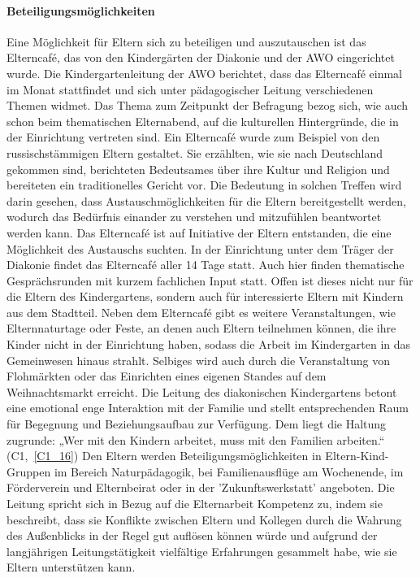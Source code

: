 \paragraph{Beteiligungsmöglichkeiten}
Eine Möglichkeit für Eltern sich zu beteiligen und auszutauschen ist das Elterncafé, das von den Kindergärten der Diakonie und der AWO eingerichtet wurde. 
Die Kindergartenleitung der AWO berichtet, dass das Elterncafé einmal im Monat stattfindet und sich unter pädagogischer Leitung verschiedenen Themen widmet. Das Thema zum Zeitpunkt der Befragung bezog sich, wie auch schon beim thematischen Elternabend, auf die kulturellen Hintergründe, die in der Einrichtung vertreten sind. Ein Elterncafé wurde zum Beispiel von den russischstämmigen Eltern gestaltet. Sie erzählten, wie sie nach Deutschland gekommen sind, berichteten Bedeutsames über ihre Kultur und Religion und bereiteten ein traditionelles Gericht vor. 
Die Bedeutung in solchen Treffen wird darin gesehen, dass Austauschmöglichkeiten für die Eltern bereitgestellt werden, wodurch das Bedürfnis einander zu verstehen und mitzufühlen beantwortet werden kann. Das Elterncafé ist auf Initiative der Eltern entstanden, die eine Möglichkeit des Austauschs suchten. 
In der Einrichtung unter dem Träger der Diakonie findet das Elterncafé aller 14 Tage statt. Auch hier finden thematische Gesprächsrunden mit kurzem fachlichen Input statt. Offen ist dieses nicht nur für die Eltern des Kindergartens, sondern auch für interessierte Eltern mit Kindern aus dem Stadtteil. 
Neben dem Elterncafé gibt es weitere Veranstaltungen, wie Elternnaturtage oder Feste, an denen auch Eltern teilnehmen können, die ihre Kinder nicht in der Einrichtung haben, sodass die Arbeit im Kindergarten in das Gemeinwesen hinaus strahlt. Selbiges wird auch durch die Veranstaltung von Flohmärkten oder das Einrichten eines eigenen Standes auf dem Weihnachtsmarkt erreicht.
Die Leitung des diakonischen Kindergartens betont eine emotional enge Interaktion mit der Familie und stellt entsprechenden Raum für Begegnung und Beziehungsaufbau zur Verfügung. Dem liegt die Haltung zugrunde: „Wer mit den Kindern arbeitet, muss mit den Familien arbeiten.“ (C1,~\ref{C1_16}) Den Eltern werden Beteiligungsmöglichkeiten in Eltern-Kind-Gruppen im Bereich Naturpädagogik, bei Familienausflüge am Wochenende, im Förderverein und Elternbeirat oder in der 'Zukunftswerkstatt' angeboten. Die Leitung spricht sich in Bezug auf die Elternarbeit Kompetenz zu, indem sie beschreibt, dass sie Konflikte zwischen Eltern und Kollegen durch die Wahrung des Außenblicks in der Regel gut auflösen können würde und aufgrund der langjährigen Leitungstätigkeit vielfältige Erfahrungen gesammelt habe, wie sie Eltern unterstützen kann.  
